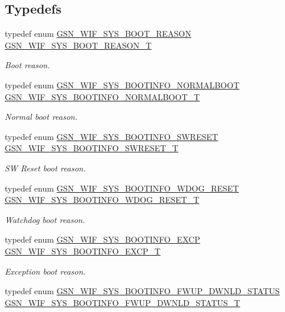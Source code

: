 \subsection*{Typedefs}
\begin{DoxyCompactItemize}
\item 
typedef enum \hyperlink{a00639_ga36af0a76d3b3d7cad5c5dd1f60c39091}{GSN\_\-WIF\_\-SYS\_\-BOOT\_\-REASON} \hyperlink{a00639_ga213ad232655e90fd6ca561d772ef7b96}{GSN\_\-WIF\_\-SYS\_\-BOOT\_\-REASON\_\-T}
\begin{DoxyCompactList}\small\item\em Boot reason. \end{DoxyCompactList}\item 
typedef enum \hyperlink{a00639_gaf19dc62e1c923b6383337e8e8296c242}{GSN\_\-WIF\_\-SYS\_\-BOOTINFO\_\-NORMALBOOT} \hyperlink{a00639_ga0c8b91590ceaee6ceb3d5267d191318d}{GSN\_\-WIF\_\-SYS\_\-BOOTINFO\_\-NORMALBOOT\_\-T}
\begin{DoxyCompactList}\small\item\em Normal boot reason. \end{DoxyCompactList}\item 
typedef enum \hyperlink{a00639_ga9d8caf6999c8508aaf8d3b414693a0a2}{GSN\_\-WIF\_\-SYS\_\-BOOTINFO\_\-SWRESET} \hyperlink{a00639_ga932935c40cc08491352069856307cf6e}{GSN\_\-WIF\_\-SYS\_\-BOOTINFO\_\-SWRESET\_\-T}
\begin{DoxyCompactList}\small\item\em SW Reset boot reason. \end{DoxyCompactList}\item 
typedef enum \hyperlink{a00639_ga93cc8ed01d7724e043b553774ec3df16}{GSN\_\-WIF\_\-SYS\_\-BOOTINFO\_\-WDOG\_\-RESET} \hyperlink{a00639_ga1e2be305dad8c272f3e260243e3af8fe}{GSN\_\-WIF\_\-SYS\_\-BOOTINFO\_\-WDOG\_\-RESET\_\-T}
\begin{DoxyCompactList}\small\item\em Watchdog boot reason. \end{DoxyCompactList}\item 
typedef enum \hyperlink{a00639_ga9447df4a60ba9be14d372720213b2c23}{GSN\_\-WIF\_\-SYS\_\-BOOTINFO\_\-EXCP} \hyperlink{a00639_ga908aa6facf38cbcd28fae2a91d83d4e7}{GSN\_\-WIF\_\-SYS\_\-BOOTINFO\_\-EXCP\_\-T}
\begin{DoxyCompactList}\small\item\em Exception boot reason. \end{DoxyCompactList}\item 
typedef enum \hyperlink{a00639_ga39cb2f02fc6abae8ae5a431aa24944c0}{GSN\_\-WIF\_\-SYS\_\-BOOTINFO\_\-FWUP\_\-DWNLD\_\-STATUS} \hyperlink{a00639_ga0a757a76eb611c307f5c94e57d0a462a}{GSN\_\-WIF\_\-SYS\_\-BOOTINFO\_\-FWUP\_\-DWNLD\_\-STATUS\_\-T}

\end{DoxyCompactItemize}

